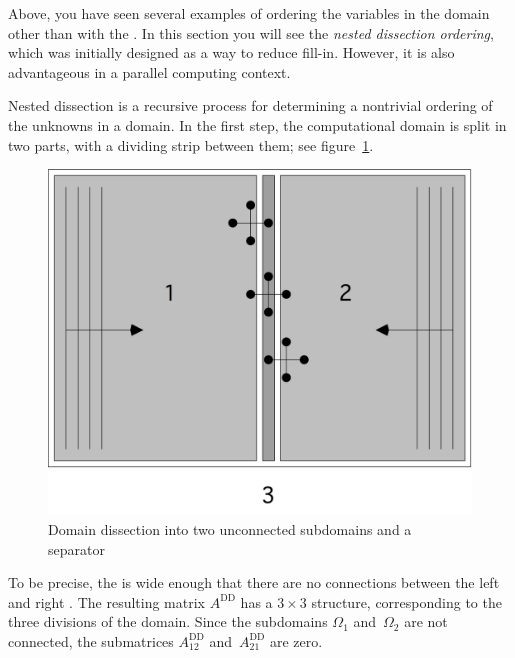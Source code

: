 Above, you have seen several examples of ordering the variables in the
domain other than with the . In this
section you will see the \emph{nested dissection ordering}, which was
initially designed as a way to reduce fill-in. However, it is also
advantageous in a parallel computing context.

Nested dissection is a recursive process for determining a nontrivial
ordering of the unknowns in a domain. In the first step, the
computational domain is split in two parts, with a dividing strip
between them; see figure~\ref{fig:domdecomp}.
\begin{figure}[ht]
  \includegraphics[scale=.1]{graphics-public/domdecomp}
  \caption{Domain dissection into two unconnected subdomains and a separator}
  \label{fig:domdecomp}
\end{figure}
\newcommand\Add{A^{\mathrm{DD}}}
To be precise, the  is wide enough that there are
no connections between the left and right . The resulting
matrix $\Add$ has a $3\times3$ structure, corresponding to the three
divisions of the domain. Since the subdomains $\Omega_1$
and~$\Omega_2$ are not connected, the submatrices $\Add_{12}$
and~$\Add_{21}$ are zero.
